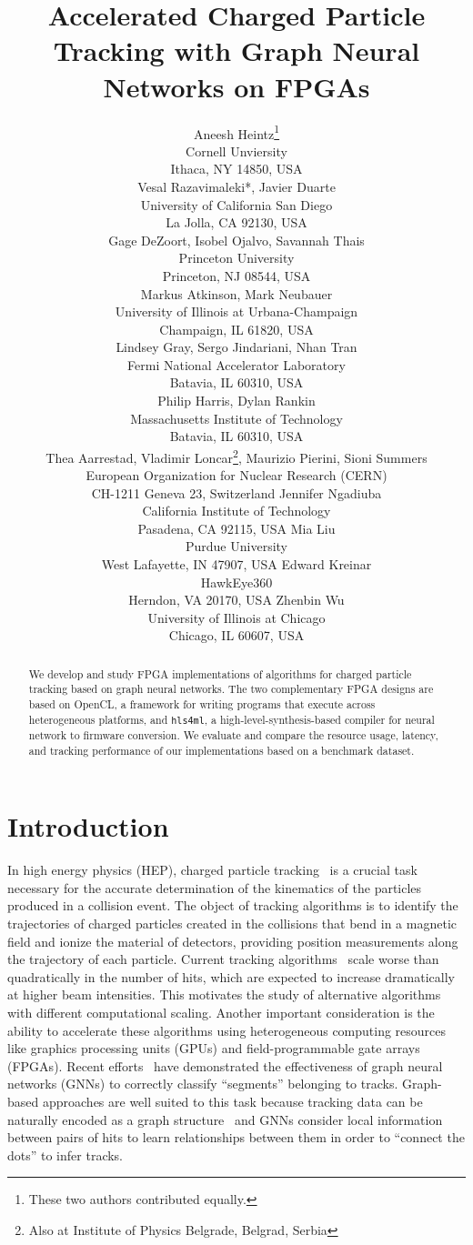 \documentclass{article}
\title{Accelerated Charged Particle Tracking with Graph Neural Networks on FPGAs}
\author{
  Aneesh Heintz\thanks{These two authors contributed equally.} \\
  Cornell Unviersity \\
  Ithaca, NY 14850, USA\\
  \And
  Vesal Razavimaleki*, Javier Duarte\\
  University of California San Diego\\
  La Jolla, CA 92130, USA \\
  \And
  Gage DeZoort, Isobel Ojalvo, Savannah Thais \\
  Princeton University \\
  Princeton, NJ 08544, USA \\
  \And
  Markus Atkinson, Mark Neubauer\\
  University of Illinois at Urbana-Champaign \\
  Champaign, IL 61820, USA\\
  \And
  Lindsey Gray, Sergo Jindariani, Nhan Tran \\
  Fermi National Accelerator Laboratory \\
  Batavia, IL 60310, USA\\
  \And
  Philip Harris, Dylan Rankin \\
  Massachusetts Institute of Technology \\
  Batavia, IL 60310, USA\\
  \And
  Thea Aarrestad, Vladimir Loncar\thanks{Also at Institute of Physics Belgrade, Belgrad, Serbia}, Maurizio Pierini, Sioni Summers \\
  European Organization for Nuclear Research (CERN) \\
  CH-1211 Geneva 23, Switzerland
  \And
  Jennifer Ngadiuba \\
  California Institute of Technology \\
  Pasadena, CA 92115, USA
  \And
  Mia Liu \\
  Purdue University \\
  West Lafayette, IN 47907, USA
  \And
  Edward Kreinar\\
  HawkEye360\\
  Herndon, VA 20170, USA
  \And
  Zhenbin Wu\\
  University of Illinois at Chicago\\
  Chicago, IL 60607, USA
}
\newcommand{\TODO}[1]{\textcolor{red}{TODO: #1}}
\newcommand{\hlsfml}{\texttt{hls4ml}\xspace}
\begin{document}

\maketitle

\begin{abstract}
We develop and study FPGA implementations of algorithms for charged particle tracking based on graph neural networks. 
The two complementary FPGA designs are based on OpenCL, a framework for writing programs that execute across heterogeneous platforms, and \hlsfml, a high-level-synthesis-based compiler for neural network to firmware conversion.
We evaluate and compare the resource usage, latency, and tracking performance of our implementations based on a benchmark dataset.
\end{abstract}

\section{Introduction}

In high energy physics (HEP), charged particle tracking~\cite{Amrouche:2019wmx,Strandlie:2010zz} is a crucial task necessary for the accurate determination of the kinematics of the particles produced in a collision event.
The object of tracking algorithms is to identify the trajectories of charged particles created in the collisions that bend in a magnetic field and ionize the material of detectors, providing position measurements along the trajectory of each particle.
Current tracking algorithms~\cite{Chatrchyan:2014fea,Aaboud:2017all,combkalman1,combkalman2,combkalman3,kalman} scale worse than quadratically in the number of hits, which are expected to increase dramatically at higher beam intensities.%
This motivates the study of alternative algorithms with different computational scaling. 
Another important consideration is the ability to accelerate these algorithms using heterogeneous computing resources like graphics processing units (GPUs) and field-programmable gate arrays (FPGAs).
Recent efforts~\cite{Farrell:2018cjr,Ju:2020xty} have demonstrated the effectiveness of graph neural networks (GNNs) to correctly classify ``segments'' belonging to tracks.
Graph-based approaches are well suited to this task because tracking data can be naturally encoded as a graph structure~\cite{Shlomi:2020gdn} and GNNs consider local information between pairs of hits to learn relationships between them in order to ``connect the dots'' to infer tracks.
\end{document}
